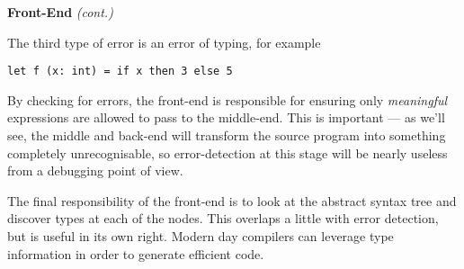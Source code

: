 \begin{minipage}[t]{0.15\textwidth}
\textbf{\sffamily Front-End} \textit{\sffamily (cont.)}    
\end{minipage}%
\begin{minipage}[t]{0.85\textwidth}
    \setlength{\parskip}{.5\baselineskip}
    The third type of error is an error of typing, for example
\begin{verbatim}
let f (x: int) = if x then 3 else 5
\end{verbatim}
    By checking for errors, the front-end is responsible for ensuring only \emph{meaningful} expressions are allowed to pass to the middle-end. This is important --- as we'll see, the middle and back-end will transform the source program into something completely unrecognisable, so error-detection at this stage will be nearly useless from a debugging point of view.

    The final responsibility of the front-end is to look at the abstract syntax tree and discover types at each of the nodes. This overlaps a little with error detection, but is useful in its own right. Modern day compilers can leverage type information in order to generate efficient code. \strut
\end{minipage}

